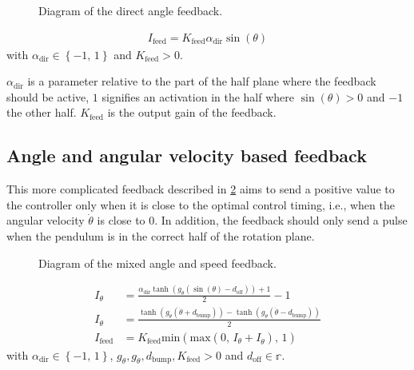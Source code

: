 \begin{figure}[!htb]
    \centering
    \caption{Diagram of the direct angle feedback.}
    \label{fig:direct_angle}
\end{figure}

\begin{align}
    I_\text{feed} = K_\text{feed}\alpha_\text{dir}\sin\left(\theta\right)
\end{align}
with $\alpha_\text{dir} \in \left\{-1,\,1\right\}$ and $K_\text{feed} > 0$.

$\alpha_\text{dir}$ is a parameter relative to the part of the half plane where the feedback should be active, $1$ signifies an activation in the half where $\sin\left(\theta\right)>0$ and $-1$ the other half. 
$K_\text{feed}$ is the output gain of the feedback.

\subsection{Angle and angular velocity based feedback}\label{sec:speed_feed}

This more complicated feedback described in \cref{fig:speed_angle} aims to send a positive value to the controller only when it is close to the optimal control timing, i.e., when the angular velocity $\dot{\theta}$ is close to $0$.
In addition, the feedback should only send a pulse when the pendulum is in the correct half of the rotation plane.

\begin{figure}[!htb]
    \centering
    \caption{Diagram of the mixed angle and speed feedback.}
    \label{fig:speed_angle}
\end{figure}

\begin{align}
    I_\theta &= \frac{\alpha_\text{dir}\tanh\left(g_\theta\left(\sin\left(\theta\right)-d_\text{off}\right)\right) + 1}{2} - 1\label{eq:speed_theta}\\
    I_{\dot{\theta}} &= \frac{\tanh\left(g_{\dot{\theta}}\left(\dot{\theta}+d_\text{bump}\right)\right) -\tanh\left(g_{\dot{\theta}}\left(\dot{\theta}-d_\text{bump}\right)\right)}{2}\label{eq:speed_bump}\\
    I_\text{feed} &= K_\text{feed}\text{min}\left(\text{max}\left(0,\, I_\theta + I_{\dot{\theta}}\right),\, 1\right)
\end{align}
with $\alpha_\text{dir} \in \left\{-1,\,1\right\}$, $g_\theta, g_{\dot{\theta}}, d_\text{bump}, K_\text{feed} > 0$ and $d_\text{off} \in \mathbb{r}$.

